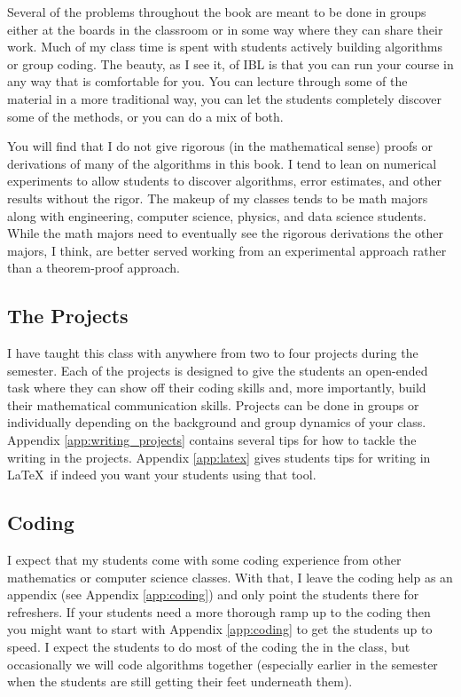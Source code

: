 Several of the problems throughout the book are meant to be done in groups either at
the boards in the classroom or in some way where they can share their work.  Much of my
class time is spent with students actively building algorithms or group coding.  The
beauty, as I see it, of IBL is that you can run your course in any way that is comfortable
for you.  You can lecture through some of the material in a more traditional way, you can
let the students completely discover some of the methods, or you can do a mix of both.

You will find that I do not give rigorous (in the mathematical sense) proofs or
derivations of many of the algorithms in this book.  I tend to lean on
numerical experiments to allow students to discover algorithms, error estimates, and other
results without the rigor.
The makeup of my classes tends to be math majors along with engineering, computer science,
physics, and data science students.  While the math majors need to eventually see the
rigorous derivations the other majors, I think, are better served working from an
experimental approach rather than a theorem-proof approach.

\subsection{The Projects}
I have taught this class with anywhere from two to four projects during the semester.
Each of the projects is designed to give the students an open-ended task where they can
show off their coding skills and, more importantly, build their mathematical communication
skills.  Projects can be done in groups or individually depending on the background and
group dynamics of your class.  Appendix \ref{app:writing_projects} contains several tips
for how to tackle the writing in the projects.  Appendix \ref{app:latex} gives students
tips for writing in \LaTeX\ if indeed you want your students using that tool.  

\subsection{Coding}
I expect that my students come with some coding experience from other mathematics or
computer science classes.  With that, I leave the coding help as an appendix (see Appendix
\ref{app:coding}) and only point the students there for refreshers.  If your students need
a more thorough ramp up to the coding then you might want to start with Appendix
\ref{app:coding} to get the students up to speed.  I expect the students to do most of the
coding the in the class, but occasionally we will code algorithms together (especially
earlier in the semester when the students are still getting their feet underneath them).

